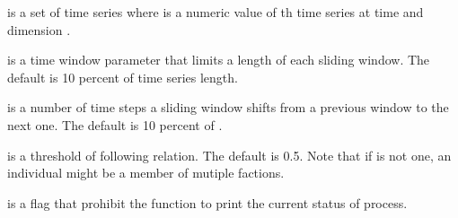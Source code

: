 \documentclass[a4paper]{book}
\begin{document}
\begin{Arguments}
\begin{ldescription}
\item[\code{TS}] is a set of time series where  is a numeric value of th time series at time  and dimension .

\item[\code{timeWindow}] is a time window parameter that limits a length of each sliding window. The default is 10 percent of time series length.

\item[\code{timeShift}] is a number of time steps a sliding window shifts from a previous window to the next one. The default is 10 percent of .

\item[\code{sigma}] is a threshold of following relation. The default is 0.5. Note that if  is not one, an individual might be a member of mutiple factions.

\item[\code{silentFlag}] is a flag that prohibit the function to print the current status of process.
\end{ldescription}
\end{Arguments}
%
\end{document}
